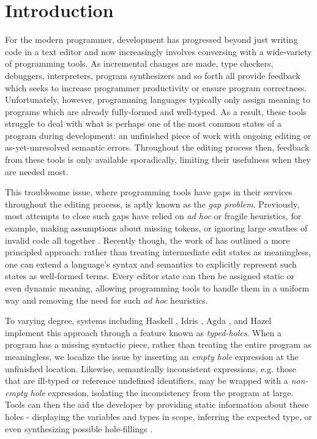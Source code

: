 \section{Introduction}

For the modern programmer, development has progressed beyond just writing code in a text editor and now increasingly involves conversing with a wide-variety of programming tools. As incremental changes are made, type checkers, debuggers, interpreters, program synthesizers and so forth all provide feedback which seeks to increase programmer productivity or ensure program correctness. Unfortunately, however, programming languages typically only assign meaning to programs which are already fully-formed and well-typed. As a result, these tools struggle to deal with what is perhaps one of the most common states of a program during development: an unfinished piece of work with ongoing editing or as-yet-unresolved semantic errors. Throughout the editing process then, feedback from these tools is only available sporadically, limiting their usefulness when they are needed most.

This troublesome issue, where programming tools have gaps in their services throughout the editing process, is aptly known as the \emph{gap problem}. Previously, most attempts to close such gaps have relied on \textit{ad hoc} or fragile heuristics, for example, making assumptions about missing tokens, or ignoring large swathes of invalid code all together \cite{DBLP:conf/oopsla/KatsJNV09, DBLP:conf/snapl/OmarVHSGAH17}. Recently though, the work of  \cite{DBLP:conf/snapl/OmarVHSGAH17} has outlined a more principled approach: rather than treating intermediate edit states as meaningless, one can extend a language's syntax and semantics to explicitly represent such states as well-formed terms. Every editor state can then be assigned static or even dynamic meaning, allowing programming tools to handle them in a uniform way and removing the need for such \emph{ad hoc} heuristics.

To varying degree, systems including Haskell \cite{GHCHoles}, Idris \cite{DBLP:journals/jfp/Brady13}, Agda \cite{DBLP:conf/icfp/Norell13}, and Hazel \cite{DBLP:conf/popl/OmarVHAH17} implement this approach through a feature known as \emph{typed-holes}. When a program has a missing syntactic piece, rather than treating the entire program as meaningless, we localize the issue by inserting an \emph{empty hole} expression at the unfinished location. Likewise, semantically inconsistent expressions, e.g. those that are ill-typed or reference undefined identifiers, may be wrapped with a \emph{non-empty hole} expression, isolating the inconsistency from the program at large. Tools can then the aid the developer by providing static information about these holes - displaying the variables and types in scope, inferring the expected type, or even synthesizing possible hole-fillings \cite{DBLP:conf/haskell/Gissurarson18, DBLP:journals/pacmpl/LubinCOC20}. 

